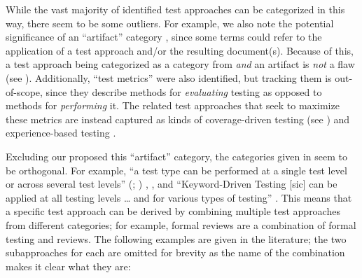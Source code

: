 While the vast majority of identified test approaches can be categorized
in this way, \ifnotpaper there seem to be some outliers. For example, \fi
we also note the potential significance of an ``artifact'' category%
, since some terms could refer to the application of
a test approach and/or the resulting document(s). Because of this, a test
approach being categorized as a category from 
\emph{and} an artifact is \emph{not} a flaw
(see ). \ifnotpaper
    Additionally, ``test metrics'' were also identified,
    but tracking them is out-of-scope, since they describe methods for
    \emph{evaluating} testing as opposed to methods for \emph{performing} it.
    The related test approaches that seek to maximize these metrics are instead
    captured as kinds of coverage-driven testing (see ) and
    experience-based testing \citep[p.~34]{IEEE2022}.

\fi
Excluding \ifnotpaper our proposed \else this \fi ``artifact'' category, the
categories given in  seem to be orthogonal. For
example, ``a test type can be performed at a single test level or across
several test levels''
\ifnotpaper
    (\citealp[p.~15]{IEEE2022}; \citeyear[p.~7]{IEEE2021})%
\else
    \cite[p.~15]{IEEE2022}, \cite[p.~7]{IEEE2021}%
\fi, and ``Keyword-Driven Testing [sic] can be applied at all testing levels
\dots{} and for various types of testing'' \citeyearpar[p.~4]{IEEE2016}.
This means that a specific test approach can be derived by combining multiple
test approaches from different categories; for example, formal reviews are a
combination of formal testing and reviews. \ifnotpaper The following examples
    are given in the literature; the two subapproaches for each are omitted
    for brevity as the name of the combination makes it clear what they are:

